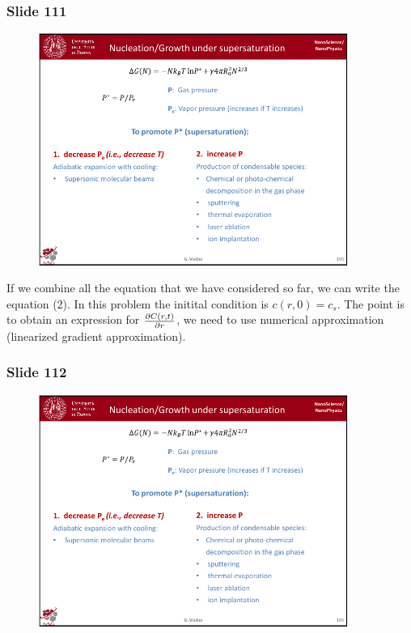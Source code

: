 \documentclass[../main/main.tex]{subfiles}
\begin{document}
\newpage

\subsubsection{Slide 111}

\begin{figure}[h!]
\centering
\includegraphics[page=7,width=0.9\textwidth]{../lessons/pdf_file/7_lesson.pdf}
\end{figure}

If we combine all the equation that we have considered so far, we can write the equation (2).
In this problem the initital condition is \( c(r,0)=c_s \). The point is to obtain an expression for \( \pdv{C(r,t)}{r}  \), we need to use numerical approximation (linearized gradient approximation).

\newpage

\subsubsection{Slide 112}

\begin{figure}[h!]
\centering
\includegraphics[page=8,width=0.9\textwidth]{../lessons/pdf_file/7_lesson.pdf}
\end{figure}
\end{document}
